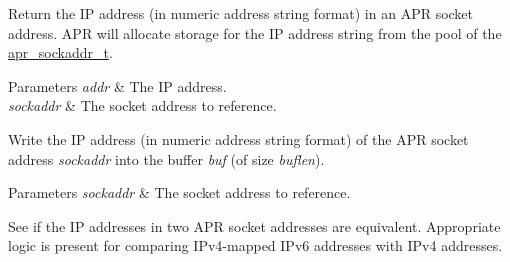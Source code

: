 Return the IP address (in numeric address string format) in an A\+PR socket address. A\+PR will allocate storage for the IP address string from the pool of the \mbox{\hyperlink{structapr__sockaddr__t}{apr\+\_\+sockaddr\+\_\+t}}. 
\begin{DoxyParams}{Parameters}
{\em addr} & The IP address. \\
\hline
{\em sockaddr} & The socket address to reference.\\
\hline
\end{DoxyParams}
Write the IP address (in numeric address string format) of the A\+PR socket address {\itshape sockaddr} into the buffer {\itshape buf} (of size {\itshape buflen}). 
\begin{DoxyParams}{Parameters}
{\em sockaddr} & The socket address to reference.\\
\hline
\end{DoxyParams}
See if the IP addresses in two A\+PR socket addresses are equivalent. Appropriate logic is present for comparing I\+Pv4-\/mapped I\+Pv6 addresses with I\+Pv4 addresses.


